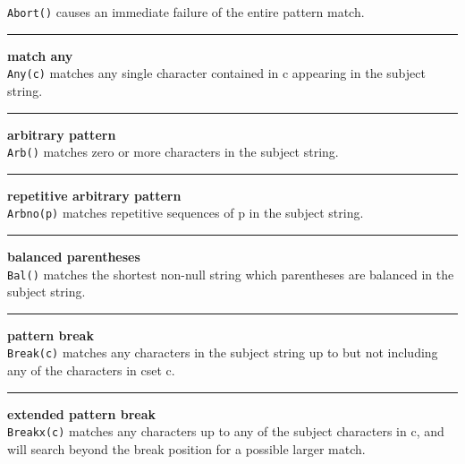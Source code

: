 \noindent
\texttt{Abort()} causes an immediate failure of the entire pattern match.\\


\bigskip\hrule\vspace{0.1cm}
 \hfill{\bf match any}\\

\noindent
\texttt{Any(c)} matches any single character contained in c appearing
in the subject string.\\

\bigskip\hrule\vspace{0.1cm}
 \hfill{\bf arbitrary pattern}\\

\noindent
\texttt{Arb()} matches zero or more characters in the subject string.\\


\bigskip\hrule\vspace{0.1cm}
 \hfill{\bf repetitive arbitrary pattern}\\

\noindent
\texttt{Arbno(p)} matches repetitive sequences of p in the subject string.\\


\bigskip\hrule\vspace{0.1cm}
 \hfill{\bf balanced parentheses}\\

\noindent
\texttt{Bal()} matches the shortest non-null string which parentheses
are balanced in the subject string.\\


\bigskip\hrule\vspace{0.1cm}
 \hfill{\bf pattern break}\\

\noindent
\texttt{Break(c)} matches any characters in the subject string up to
but not including any of the characters in cset c.\\


\bigskip\hrule\vspace{0.1cm}
 \hfill{\bf extended pattern break}\\

\noindent
\texttt{Breakx(c)} matches any characters up to any of the subject
characters in c, and 
will search beyond the break position for a possible larger match.\\


